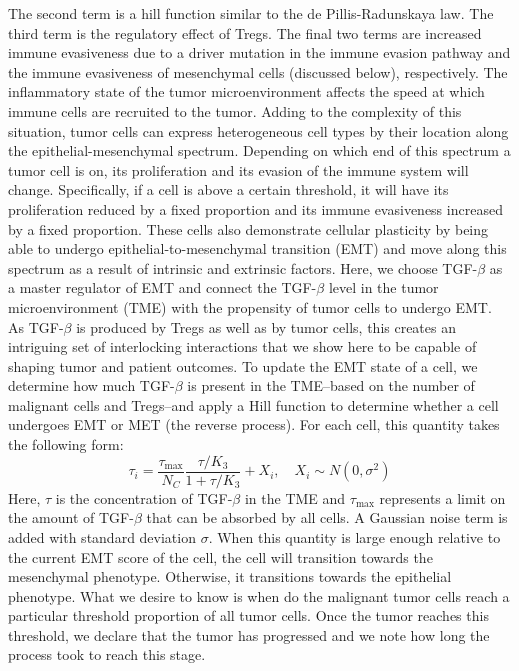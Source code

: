 \documentclass[11pt]{article}
\begin{document}
\begin{framed}
    The second term is a hill function similar to the de Pillis-Radunskaya law.
    The third term is the regulatory effect of Tregs.
    The final two terms are increased immune evasiveness due to a driver mutation in the immune evasion pathway and the immune evasiveness of mesenchymal cells (discussed below), respectively.
    The inflammatory state of the tumor microenvironment affects the speed at which immune cells are recruited to the tumor.
    \newline
    Adding to the complexity of this situation, tumor cells can express heterogeneous cell types by their location along the epithelial-mesenchymal spectrum.
    Depending on which end of this spectrum a tumor cell is on, its proliferation and its evasion of the immune system will change.
    Specifically, if a cell is above a certain threshold, it will have its proliferation reduced by a fixed proportion and its immune evasiveness increased by a fixed proportion.
    These cells also demonstrate cellular plasticity by being able to undergo epithelial-to-mesenchymal transition (EMT) and move along this spectrum as a result of intrinsic and extrinsic factors.
    Here, we choose TGF-$\beta$ as a master regulator of EMT and connect the TGF-$\beta$ level in the tumor microenvironment (TME) with the propensity of tumor cells to undergo EMT.
    As TGF-$\beta$ is produced by Tregs as well as by tumor cells, this creates an intriguing set of interlocking interactions that we show here to be capable of shaping tumor and patient outcomes.
    To update the EMT state of a cell, we determine how much TGF-$\beta$ is present in the TME--based on the number of malignant cells and Tregs--and apply a Hill function to determine whether a cell undergoes EMT or MET (the reverse process).
    For each cell, this quantity takes the following form:
    $$
    \tau_i = \frac{\tau_{\text{max}}}{N_C}\frac{\tau/K_3}{1+\tau/K_3} + X_i, \quad X_i \sim N(0,\sigma^2)
    $$
    Here, $\tau$ is the concentration of TGF-$\beta$ in the TME and $\tau_\text{max}$ represents a limit on the amount of TGF-$\beta$ that can be absorbed by all cells.
    A Gaussian noise term is added with standard deviation $\sigma$.
    When this quantity is large enough relative to the current EMT score of the cell, the cell will transition towards the mesenchymal phenotype.
    Otherwise, it transitions towards the epithelial phenotype.
    \newline
    What we desire to know is when do the malignant tumor cells reach a particular threshold proportion of all tumor cells.
    Once the tumor reaches this threshold, we declare that the tumor has progressed and we note how long the process took to reach this stage.
\end{framed}
\end{document}
